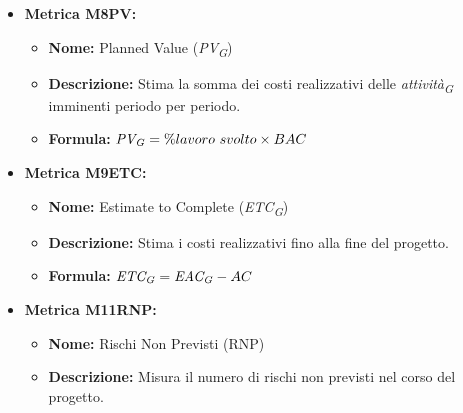 \begin{itemize}
    \item \hypertarget{item:M8PV}{\textbf{Metrica M8PV:}}
    \begin{minipage}[t]{0.9\textwidth}
          \begin{itemize}
              \item \textbf{Nome:} Planned Value (\textit{PV}\textsubscript{\textit{G}})
              \item \textbf{Descrizione:} Stima la somma dei costi realizzativi delle \textit{attività}\textsubscript{\textit{G}} imminenti periodo per periodo.
              \item \textbf{Formula:} $\textit{PV}\textsubscript{\textit{G}} = \% lavoro \ svolto \times BAC$
          \end{itemize}
        \end{minipage}

    \item \hypertarget{item:M9ETC}{\textbf{Metrica M9ETC:}}
    \begin{minipage}[t]{0.9\textwidth}
          \begin{itemize}
              \item \textbf{Nome:} Estimate to Complete (\textit{ETC}\textsubscript{\textit{G}})
              \item \textbf{Descrizione:} Stima i costi realizzativi fino alla fine del progetto.
              \item \textbf{Formula:} $\textit{ETC}\textsubscript{\textit{G}} =\textit{EAC}\textsubscript{\textit{G}} - AC$
          \end{itemize}
        \end{minipage}

    \item \hypertarget{item:M11RNP}{\textbf{Metrica M11RNP:}}
    \begin{minipage}[t]{0.9\textwidth}
          \begin{itemize}
              \item \textbf{Nome:} Rischi Non Previsti (RNP)
              \item \textbf{Descrizione:} Misura il numero di rischi non previsti nel corso del progetto.
          \end{itemize}
        \end{minipage}


\end{itemize}

